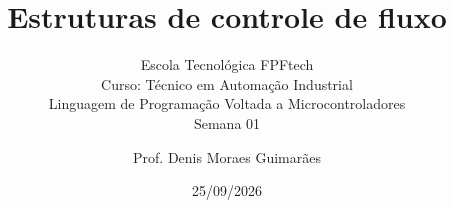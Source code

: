 \title{Estruturas de controle de fluxo}
\subtitle{\texorpdfstring{Escola Tecnológica FPFtech\\[0.2cm]
Curso: Técnico em Automação Industrial\\[0.2cm]
\small Linguagem de Programação Voltada a Microcontroladores\\[0.15cm]
Semana 01}{FPFtech — Técnico em Automação Industrial — Semana 01}}
\author{Prof. Denis Moraes Guimarães}
\date{25/09/2026}
